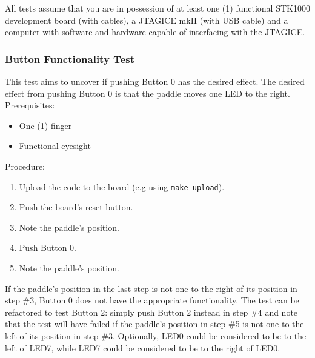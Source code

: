 All tests assume that you are in possession of at least one (1) functional STK1000 development board (with cables), a JTAGICE mkII (with USB cable) and a computer with software and hardware capable of interfacing with the JTAGICE.
\subsubsection{Button Functionality Test}
This test aims to uncover if pushing Button 0 has the desired effect. The desired effect from pushing Button 0 is that the paddle moves one LED to the right.
\\ Prerequisites:
\begin{itemize}
	\item One (1) finger
	\item Functional eyesight
\end{itemize}
Procedure:
\begin{enumerate}
	\item Upload the code to the board (e.g using \texttt{make upload}).
	\item Push the board's reset button.
	\item Note the paddle's position.
	\item Push Button 0.
	\item Note the paddle's position.
\end{enumerate}
If the paddle's position in the last step is not one to the right of its position in step \#3, Button 0 does not have the appropriate functionality.
The test can be refactored to test Button 2: simply push Button 2 instead in step \#4 and note that the test will have failed if the paddle's position in step \#5 is not one to the left of its position in step \#3.
Optionally, LED0 could be considered to be to the left of LED7, while LED7 could be considered to be to the right of LED0.

